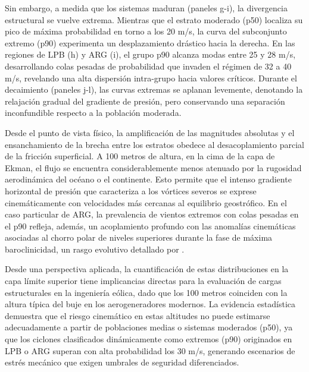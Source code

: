 Sin embargo, a medida que los sistemas maduran (paneles g-i), la divergencia estructural se vuelve extrema. Mientras que el estrato moderado (p50) localiza su pico de máxima probabilidad en torno a los 20 m/s, la curva del subconjunto extremo (p90) experimenta un desplazamiento drástico hacia la derecha. En las regiones de LPB (h) y ARG (i), el grupo p90 alcanza modas entre 25 y 28 m/s, desarrollando colas pesadas de probabilidad que invaden el régimen de 32 a 40 m/s, revelando una alta dispersión intra-grupo hacia valores críticos. Durante el decaimiento (paneles j-l), las curvas extremas se aplanan levemente, denotando la relajación gradual del gradiente de presión, pero conservando una separación inconfundible respecto a la población moderada.

Desde el punto de vista físico, la amplificación de las magnitudes absolutas y el ensanchamiento de la brecha entre los estratos obedece al desacoplamiento parcial de la fricción superficial. A 100 metros de altura, en la cima de la capa de Ekman, el flujo se encuentra considerablemente menos atenuado por la rugosidad aerodinámica del océano o el continente. Esto permite que el intenso gradiente horizontal de presión que caracteriza a los vórtices severos \citep{reboita2010south} se exprese cinemáticamente con velocidades más cercanas al equilibrio geostrófico. En el caso particular de ARG, la prevalencia de vientos extremos con colas pesadas en el p90 refleja, además, un acoplamiento profundo con las anomalías cinemáticas asociadas al chorro polar de niveles superiores durante la fase de máxima baroclinicidad, un rasgo evolutivo detallado por \citet{hoskins2005new}.

Desde una perspectiva aplicada, la cuantificación de estas distribuciones en la capa límite superior tiene implicancias directas para la evaluación de cargas estructurales en la ingeniería eólica, dado que los 100 metros coinciden con la altura típica del buje en los aerogeneradores modernos. La evidencia estadística demuestra que el riesgo cinemático en estas altitudes no puede estimarse adecuadamente a partir de poblaciones medias o sistemas moderados (p50), ya que los ciclones clasificados dinámicamente como extremos (p90) originados en LPB o ARG superan con alta probabilidad los 30 m/s, generando escenarios de estrés mecánico que exigen umbrales de seguridad diferenciados.

%
